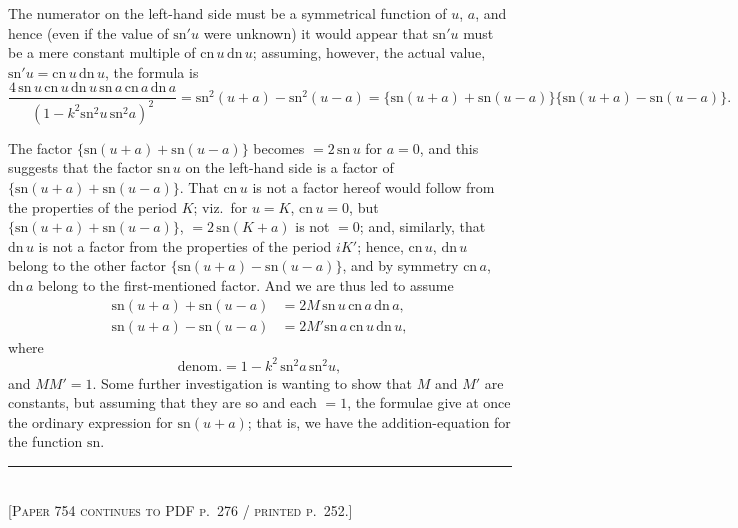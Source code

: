 \documentclass[11pt,a4paper]{article}
\begin{document}
The numerator on the left-hand side must be a symmetrical function of $u$,
$a$, and hence (even if the value of $\mathrm{sn}'u$ were unknown) it would
appear that $\mathrm{sn}'u$ must be a mere constant multiple of
$\mathrm{cn}\,u\,\mathrm{dn}\,u$; assuming, however, the actual value,
$\mathrm{sn}'u = \mathrm{cn}\,u\,\mathrm{dn}\,u$, the formula is
\[
  \frac{4\,\mathrm{sn}\,u\,\mathrm{cn}\,u\,\mathrm{dn}\,u\,
        \mathrm{sn}\,a\,\mathrm{cn}\,a\,\mathrm{dn}\,a}
       {(1 - k^{2}\mathrm{sn}^{2} u\,\mathrm{sn}^{2} a)^{2}}
   = \mathrm{sn}^{2}(u + a) - \mathrm{sn}^{2}(u - a)
   = \{\mathrm{sn}(u + a) + \mathrm{sn}(u - a)\}
     \{\mathrm{sn}(u + a) - \mathrm{sn}(u - a)\}.
\]

The factor $\{\mathrm{sn}(u + a) + \mathrm{sn}(u - a)\}$ becomes
$= 2\,\mathrm{sn}\,u$ for $a = 0$, and this suggests that the factor
$\mathrm{sn}\,u$ on the left-hand side is a factor of
$\{\mathrm{sn}(u + a) + \mathrm{sn}(u - a)\}$.  That $\mathrm{cn}\,u$ is not
a factor hereof would follow from the properties of the period $K$; viz.\
for $u = K$, $\mathrm{cn}\,u = 0$, but
$\{\mathrm{sn}(u + a) + \mathrm{sn}(u - a)\}$, $= 2\,\mathrm{sn}(K + a)$ is
not $= 0$; and, similarly, that $\mathrm{dn}\,u$ is not a factor from the
properties of the period $iK'$; hence, $\mathrm{cn}\,u$, $\mathrm{dn}\,u$
belong to the other factor $\{\mathrm{sn}(u + a) - \mathrm{sn}(u - a)\}$, and
by symmetry $\mathrm{cn}\,a$, $\mathrm{dn}\,a$ belong to the
first-mentioned factor.  And we are thus led to assume
\begin{align*}
  \mathrm{sn}(u + a) + \mathrm{sn}(u - a) & = 2M\,\mathrm{sn}\,u\,\mathrm{cn}\,a\,\mathrm{dn}\,a, \\
  \mathrm{sn}(u + a) - \mathrm{sn}(u - a) & = 2M'\mathrm{sn}\,a\,\mathrm{cn}\,u\,\mathrm{dn}\,u,
\end{align*}
where
\[
  \text{denom.} = 1 - k^{2}\,\mathrm{sn}^{2} a\,\mathrm{sn}^{2} u,
\]
and $MM' = 1$. Some further investigation is wanting to show that $M$ and
$M'$ are constants, but assuming that they are so and each $= 1$, the
formulae give at once the ordinary expression for $\mathrm{sn}(u + a)$; that
is, we have the addition-equation for the function $\mathrm{sn}$.

\bigskip
\noindent\rule{0.35\textwidth}{0.4pt}\\[2pt]
\footnotesize\textsc{[Paper 754 continues to PDF p.~276 / printed p.~252.]}\normalsize
\end{document}
